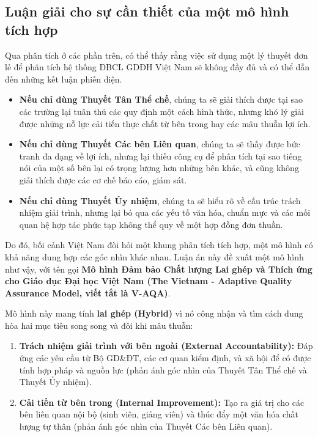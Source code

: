 \documentclass[12pt, a4paper, openany]{report}
\begin{document}
\subsection{Luận giải cho sự cần thiết của một mô hình tích hợp}
\label{subsec:luan_giai_V-AQA}
Qua phân tích ở các phần trên, có thể thấy rằng việc sử dụng một lý thuyết đơn lẻ để phân tích hệ thống ĐBCL GDĐH Việt Nam sẽ không đầy đủ và có thể dẫn đến những kết luận phiến diện.
\begin{itemize}
    \item \textbf{Nếu chỉ dùng Thuyết Tân Thể chế}, chúng ta sẽ giải thích được tại sao các trường lại tuân thủ các quy định một cách hình thức, nhưng khó lý giải được những nỗ lực cải tiến thực chất từ bên trong hay các mâu thuẫn lợi ích.
    \item \textbf{Nếu chỉ dùng Thuyết Các bên Liên quan}, chúng ta sẽ thấy được bức tranh đa dạng về lợi ích, nhưng lại thiếu công cụ để phân tích tại sao tiếng nói của một số bên lại có trọng lượng hơn những bên khác, và cũng không giải thích được các cơ chế báo cáo, giám sát.
    \item \textbf{Nếu chỉ dùng Thuyết Ủy nhiệm}, chúng ta sẽ hiểu rõ về cấu trúc trách nhiệm giải trình, nhưng lại bỏ qua các yếu tố văn hóa, chuẩn mực và các mối quan hệ hợp tác phức tạp không thể quy về một hợp đồng đơn thuần.
\end{itemize}

Do đó, bối cảnh Việt Nam đòi hỏi một khung phân tích tích hợp, một mô hình có khả năng dung hợp các góc nhìn khác nhau. Luận án này đề xuất một mô hình như vậy, với tên gọi \textbf{Mô hình Đảm bảo Chất lượng Lai ghép và Thích ứng cho Giáo dục Đại học Việt Nam (The Vietnam - Adaptive Quality Assurance Model, viết tắt là V-AQA)}.

Mô hình này mang tính \textbf{lai ghép (Hybrid)} vì nó công nhận và tìm cách dung hòa hai mục tiêu song song và đôi khi mâu thuẫn:
\begin{enumerate}
    \item \textbf{Trách nhiệm giải trình với bên ngoài (External Accountability):} Đáp ứng các yêu cầu từ Bộ GD\&ĐT, các cơ quan kiểm định, và xã hội để có được tính hợp pháp và nguồn lực (phản ánh góc nhìn của Thuyết Tân Thể chế và Thuyết Ủy nhiệm).
    \item \textbf{Cải tiến từ bên trong (Internal Improvement):} Tạo ra giá trị cho các bên liên quan nội bộ (sinh viên, giảng viên) và thúc đẩy một văn hóa chất lượng tự thân (phản ánh góc nhìn của Thuyết Các bên Liên quan).
\end{enumerate}
\end{document}

